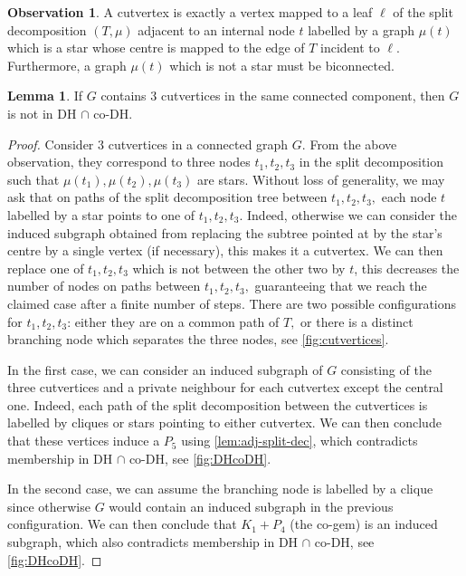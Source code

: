 \documentclass{amsart}
\def\DHcoDH{DH $\cap$ co-DH}
\theoremstyle{definition}
\newtheorem{lemma}{Lemma}
\newtheorem{observation}{Observation}
\begin{document}
\begin{observation}
	A cutvertex is exactly a vertex mapped to a leaf $\ell$ of the split
	decomposition $(T,\mu)$ adjacent to an internal node $t$ labelled by a
	graph $\mu(t)$ which is a star whose centre is mapped to the edge of $T$
	incident to $\ell$. Furthermore, a graph $\mu(t)$ which is not a star must
	be biconnected.
\end{observation}

\begin{lemma}\label{lem:cutvertices}
	If $G$ contains $3$ cutvertices in the same connected component, then $G$
	is not in \DHcoDH{}.
\end{lemma}

\begin{proof}
	Consider $3$ cutvertices in a connected graph $G$. From the above
	observation, they correspond to three nodes $t_1,t_2,t_3$ in the split
	decomposition such that $\mu(t_1),\mu(t_2),\mu(t_3)$ are stars. Without
	loss of generality, we may ask that on paths of the split decomposition
	tree between $t_1,t_2,t_3,$ each node $t$ labelled by a star points to one
	of $t_1,t_2,t_3$. Indeed, otherwise we can consider the induced subgraph
	obtained from replacing the subtree pointed at by the star's centre by a
	single vertex (if necessary), this makes it a cutvertex. We can then
	replace one of $t_1,t_2,t_3$ which is not between the other two by $t$,
	this decreases the number of nodes on paths between $t_1,t_2,t_3,$
	guaranteeing that we reach the claimed case after a finite number of steps.
	There are two possible configurations for $t_1,t_2,t_3$:
	either they are on a common path of $T,$
	or there is a distinct branching node which separates the three nodes, see
	\cref{fig:cutvertices}.

	In the first case, we can consider an induced subgraph of $G$ consisting of
	the three cutvertices and a private neighbour for each cutvertex except the
	central one.
	Indeed, each path of the split decomposition between the cutvertices is
	labelled by cliques or stars pointing to either cutvertex. We can then
	conclude that these vertices induce a $P_5$ using \cref{lem:adj-split-dec},
	which contradicts membership in \DHcoDH{}, see \cref{fig:DHcoDH}.

	In the second case, we can assume the branching node is labelled by a
	clique since otherwise $G$ would contain an induced subgraph in the previous
	configuration. We can then conclude that $K_1+P_4$ (the co-gem) is an
	induced subgraph, which also contradicts membership in \DHcoDH{}, see \cref{fig:DHcoDH}.
\end{proof}
\end{document}
